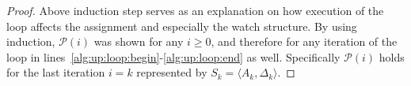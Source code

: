 \documentclass{vutinfth} %
\newcommand{\negweak}[1]{\overline{#1}^w}
\newcommand{\ass}{A}
\newcommand{\fabef}{\ass_{i}}
\newcommand{\faaf}{\ass_{i + 1}}
\newcommand{\abef}{\fabef{k + i}}
\newcommand{\aaf}{\faaf^{k + i + 1}}
\newcommand{\dbef}{\Delta_{i}}
\newcommand{\sgl}{\mu}
\newcommand{\bsgl}{\sigma}
\begin{document}
\begin{proof}
\begin{comment}
\end{enumerate}
\item To show that $\delta$ is not unit under $\aaf$:
\begin{enumerate}
\item Assume $\delta$ is satisfied under $\abef$. Then $\delta$ is not unit under $\aaf$ because $\abef \subset \aaf$.
\item Assume $\delta$ is not satisfied under $\abef$. Then there are at least two literals $\bsgl_1, \bsgl_2, \ldots \in \delta$ that are unassigned wrt.~$\abef$, as $\delta$ is not unit under $\abef$ (inv2). Further, $\delta \in \dbef^\pm(\bsgl_1)$ and $\delta \in \dbef^\pm(\bsgl_2)$ (inv3). From $\delta \not \in \dbef^\pm(\sgl_i)$ it follows that $\sgl_i \not = \bsgl_1$ and $\sgl_i \not = \bsgl_2$. %
Therefore $\delta$ is not unit, because $\bsgl_1, \bsgl_2 \in \delta$ are unassigned wrt.~$\aaf$.
\end{enumerate}
\item Assume $\delta$ is not satisfied under $\aaf$ and contains at least two literals $\bsgl_1, \bsgl_2, \ldots$ unassigned under $\aaf$. Then $\bsgl_1, \bsgl_2$ are unassigned wrt.~$\abef$ and $\delta$ is not satisfied wrt.~$\abef$ because $\abef \subset \aaf$ and $\delta \not \in \dbef^\pm(\sgl_i)$ and $\delta$ is not unit wrt.~$\abef$.
\item Same as 1.d ...
\end{enumerate}
\item Else ($\delta \in \dbef^\pm(\sgl_i)$), i.e.~$\delta$ was watched on $\sgl_i$.
\begin{enumerate}
\item If $\delta$ is weakly unit under $\aaf$ with $\bsgl$ unassigned, then the algorithm generates the assignment $\negweak{\bsgl}$.
\item Else
\item If there are two unassigned pointer move $\to$ two unassigned literals
\item pointer move $\to$ two unassigned literals
\item violated $\to$ conflict
\item weakly unit $\to$ satisfied
\end{enumerate}
\end{enumerate}
\end{enumerate}
\end{comment}

Above induction step serves as an explanation on how execution of the loop affects the assignment and especially the watch structure. By using induction, $\mathcal{P}(i)$ was shown for any $i \geq 0$, and therefore for any iteration of the loop in lines~\ref{alg:up:loop:begin}-\ref{alg:up:loop:end} as well. Specifically $\mathcal{P}(i)$ holds for the last iteration $i = k$ represented by $S_k = \langle \ass_k, \Delta_k \rangle$.


\end{proof}
\end{document}
